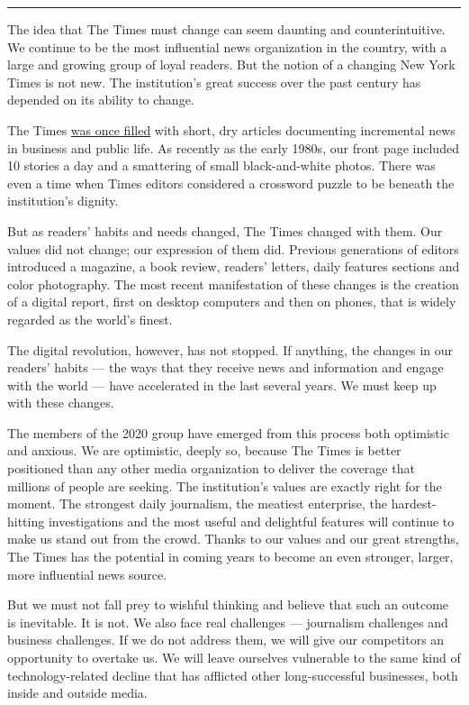 \begin{center}\rule{0.5\linewidth}{\linethickness}\end{center}

The idea that The Times must change can seem daunting and
counterintuitive. We continue to be the most influential news
organization in the country, with a large and growing group of loyal
readers. But the notion of a changing New York Times is not new. The
institution's great success over the past century has depended on its
ability to change.

The Times
\href{https://timesmachine.nytimes3xbfgragh.onion/timesmachine/1917/01/17/issue.html}{was
once filled} with short, dry articles documenting incremental news in
business and public life. As recently as the early 1980s, our front page
included 10 stories a day and a smattering of small black-and-white
photos. There was even a time when Times editors considered a crossword
puzzle to be beneath the institution's dignity.

But as readers' habits and needs changed, The Times changed with them.
Our values did not change; our expression of them did. Previous
generations of editors introduced a magazine, a book review, readers'
letters, daily features sections and color photography. The most recent
manifestation of these changes is the creation of a digital report,
first on desktop computers and then on phones, that is widely regarded
as the world's finest.

The digital revolution, however, has not stopped. If anything, the
changes in our readers' habits --- the ways that they receive news and
information and engage with the world --- have accelerated in the last
several years. We must keep up with these changes.

The members of the 2020 group have emerged from this process both
optimistic and anxious. We are optimistic, deeply so, because The Times
is better positioned than any other media organization to deliver the
coverage that millions of people are seeking. The institution's values
are exactly right for the moment. The strongest daily journalism, the
meatiest enterprise, the hardest-hitting investigations and the most
useful and delightful features will continue to make us stand out from
the crowd. Thanks to our values and our great strengths, The Times has
the potential in coming years to become an even stronger, larger, more
influential news source.

But we must not fall prey to wishful thinking and believe that such an
outcome is inevitable. It is not. We also face real challenges ---
journalism challenges and business challenges. If we do not address
them, we will give our competitors an opportunity to overtake us. We
will leave ourselves vulnerable to the same kind of technology-related
decline that has afflicted other long-successful businesses, both inside
and outside media.

